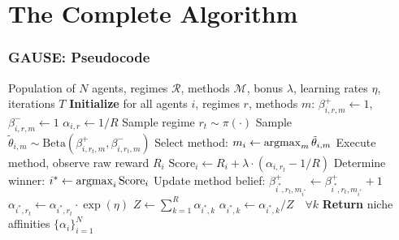 \documentclass[11pt,a4paper]{article}
\theoremstyle{definition}
\theoremstyle{plain}
\newcommand{\argmax}{\operatornamewithlimits{argmax}}
\begin{document}
\newpage
\part{The Complete Algorithm}

\section{GAUSE: Pseudocode}

\begin{algorithm}[H]
\caption{GAUSE Algorithm}
\label{alg:niche-population}
\begin{algorithmic}[1]
\REQUIRE Population of $N$ agents, regimes $\mathcal{R}$, methods $\mathcal{M}$, bonus $\lambda$, learning rates $\eta$, iterations $T$
\STATE \textbf{Initialize} for all agents $i$, regimes $r$, methods $m$:
\STATE \hspace{1cm} $\beta_{i,r,m}^+ \gets 1$, $\beta_{i,r,m}^- \gets 1$ 
\STATE \hspace{1cm} $\alpha_{i,r} \gets 1/R$ 
    \STATE Sample regime $r_t \sim \pi(\cdot)$
        \STATE {}
            \STATE Sample $\tilde{\theta}_{i,m} \sim \text{Beta}(\beta_{i,r_t,m}^+, \beta_{i,r_t,m}^-)$
        \ENDFOR
        \STATE Select method: $m_i \gets \argmax_m \tilde{\theta}_{i,m}$
        \STATE Execute method, observe raw reward $R_i$
        \STATE {}
        \STATE $\text{Score}_i \gets R_i + \lambda \cdot (\alpha_{i,r_t} - 1/R)$
    \ENDFOR
    \STATE {}
    \STATE Determine winner: $i^* \gets \argmax_i \text{Score}_i$
    \STATE {}
    \STATE Update method belief: $\beta_{i^*,r_t,m_{i^*}}^+ \gets \beta_{i^*,r_t,m_{i^*}}^+ + 1$
    \STATE {}
    \STATE $\alpha_{i^*,r_t} \gets \alpha_{i^*,r_t} \cdot \exp(\eta)$
    \STATE $Z \gets \sum_{k=1}^{R} \alpha_{i^*,k}$ 
    \STATE $\alpha_{i^*,k} \gets \alpha_{i^*,k} / Z \quad \forall k$
\ENDFOR
\STATE \textbf{Return} niche affinities $\{\alpha_i\}_{i=1}^N$
\end{algorithmic}
\end{algorithm}
\end{document}
